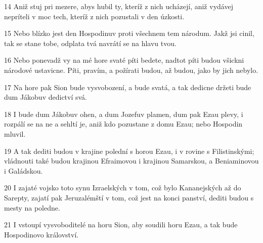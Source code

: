 \par 14 Aniž stuj pri mezere, abys hubil ty, kteríž z nich ucházejí, aniž vydávej nepríteli v moc tech, kteríž z nich pozustali v den úzkosti.
\par 15 Nebo blízko jest den Hospodinuv proti všechnem tem národum. Jakž jsi cinil, tak se stane tobe, odplata tvá navrátí se na hlavu tvou.
\par 16 Nebo ponevadž vy na mé hore svaté píti bedete, nadtot píti budou všickni národové ustavicne. Píti, pravím, a požírati budou, až budou, jako by jich nebylo.
\par 17 Na hore pak Sion bude vysvobození, a bude svatá, a tak dedicne držeti bude dum Jákobuv dedictví svá.
\par 18 I bude dum Jákobuv ohen, a dum Jozefuv plamen, dum pak Ezau plevy, i rozpálí se na ne a sehltí je, aniž kdo pozustane z domu Ezau; nebo Hospodin mluvil.
\par 19 A tak dediti budou v krajine polední s horou Ezau, i v rovine s Filistinskými; vládnouti také budou krajinou Efraimovou i krajinou Samarskou, a Beniaminovou i Galádskou.
\par 20 I zajaté vojsko toto synu Izraelských v tom, což bylo Kananejských až do Sarepty, zajatí pak Jeruzalémští v tom, což jest na konci panství, dediti budou s mesty na poledne.
\par 21 I vstoupí vysvoboditelé na horu Sion, aby soudili horu Ezau, a tak bude Hospodinovo království.

